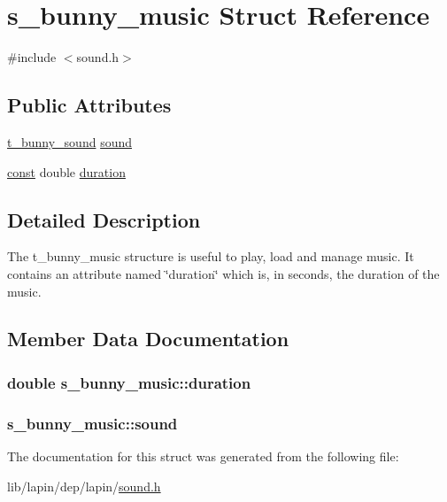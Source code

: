 \hypertarget{structs__bunny__music}{\section{s\-\_\-bunny\-\_\-music Struct Reference}
\label{structs__bunny__music}
}


{\ttfamily \#include $<$sound.\-h$>$}

\subsection*{Public Attributes}
\begin{DoxyCompactItemize}
\item 
\hyperlink{sound_8h_af5566812e76e3d6b601768a24d114a14}{t\-\_\-bunny\-\_\-sound} \hyperlink{structs__bunny__music_a2a64d598617bee0d76ab86d82df76f3c}{sound}
\item 
\hyperlink{term__entry_8h_a57bd63ce7f9a353488880e3de6692d5a}{const} double \hyperlink{structs__bunny__music_ab898e2b4e3fd2b7c3d34fd0f25b77218}{duration}
\end{DoxyCompactItemize}


\subsection{Detailed Description}
The t\-\_\-bunny\-\_\-music structure is useful to play, load and manage music. It contains an attribute named \char`\"{}duration\char`\"{} which is, in seconds, the duration of the music. 

\subsection{Member Data Documentation}
\hypertarget{structs__bunny__music_ab898e2b4e3fd2b7c3d34fd0f25b77218}{
\subsubsection[{duration}]{ double s\-\_\-bunny\-\_\-music\-::duration}}\label{structs__bunny__music_ab898e2b4e3fd2b7c3d34fd0f25b77218}
\hypertarget{structs__bunny__music_a2a64d598617bee0d76ab86d82df76f3c}{
\subsubsection[{sound}]{ s\-\_\-bunny\-\_\-music\-::sound}}\label{structs__bunny__music_a2a64d598617bee0d76ab86d82df76f3c}


The documentation for this struct was generated from the following file\-:\begin{DoxyCompactItemize}
\item 
lib/lapin/dep/lapin/\hyperlink{sound_8h}{sound.\-h}\end{DoxyCompactItemize}
